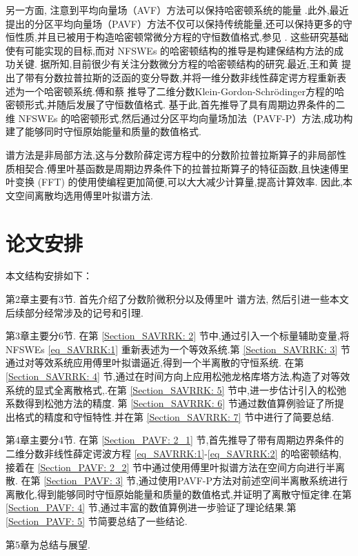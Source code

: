 另一方面,
注意到平均向量场（AVF）方法可以保持哈密顿系统的能量 \cite{buddGeometricIntegrationUsing1999,quispelNewClassEnergypreserving2008}.此外,最近提出的分区平均向量场（PAVF）方法不仅可以保持传统能量,还可以保持更多的守恒性质,并且已被用于构造哈密顿常微分方程的守恒数值格式,参见 \cite{caiPartitionedAveragedVector2018}.
这些研究基础使有可能实现的目标,而对 NFSWEs 的哈密顿结构的推导是构建保结构方法的成功关键.
据所知,目前很少有关注分数微分方程的哈密顿结构的研究.最近,王和黄 \cite{wangStructurepreservingNumericalMethods2018} 提出了带有分数拉普拉斯的泛函的变分导数,并将一维分数非线性薛定谔方程重新表述为一个哈密顿系统.傅和蔡 \cite{fuStructurepreservingAlgorithmsTwodimensional2020} 推导了二维分数Klein-Gordon-Schr{\"o}dinger方程的哈密顿形式,并随后发展了守恒数值格式.
基于此,首先推导了具有周期边界条件的二维 NFSWEs 的哈密顿形式,然后通过分区平均向量场加法（PAVF-P）方法,成功构建了能够同时守恒原始能量和质量的数值格式.

谱方法是非局部方法,这与分数阶薛定谔方程中的分数阶拉普拉斯算子的非局部性质相契合.傅里叶基函数是周期边界条件下的拉普拉斯算子的特征函数,且快速傅里叶变换 (FFT) 的使用使编程更加简便,可以大大减少计算量,提高计算效率.
因此,本文空间离散均选用傅里叶拟谱方法.

\section{论文安排}
本文结构安排如下：

第2章主要有3节. 首先介绍了分数阶微积分以及傅里叶 谱方法, 
然后引进一些本文后续部分经常涉及的记号和引理.

第3章主要分6节. 在第 \ref{Section_SAVRRK: 2} 节中,通过引入一个标量辅助变量,将NFSWEs \eqref{eq_SAVRRK:1} 重新表述为一个等效系统.第 \ref{Section_SAVRRK: 3} 节通过对等效系统应用傅里叶拟谱逼近,得到一个半离散的守恒系统.
在第 \ref{Section_SAVRRK: 4} 节,通过在时间方向上应用松弛龙格库塔方法,构造了对等效系统的显式全离散格式,.在第 \ref{Section_SAVRRK: 5} 节中,进一步估计引入的松弛系数得到松弛方法的精度.
第 \ref{Section_SAVRRK: 6} 节通过数值算例验证了所提出格式的精度和守恒特性.并在第 \ref{Section_SAVRRK: 7} 节中进行了简要总结.

第4章主要分4节. 在第 \ref{Section_PAVF: 2_1} 节,首先推导了带有周期边界条件的二维分数非线性薛定谔波方程 \eqref{eq_SAVRRK:1}-\eqref{eq_SAVRRK:2} 的哈密顿结构, 接着在 \ref{Section_PAVF: 2_2} 节中通过使用傅里叶拟谱方法在空间方向进行半离散.
在第 \ref{Section_PAVF: 3} 节,通过使用PAVF-P方法对前述空间半离散系统进行离散化,得到能够同时守恒原始能量和质量的数值格式,并证明了离散守恒定律.在第 \ref{Section_PAVF: 4} 节,通过丰富的数值算例进一步验证了理论结果.第 \ref{Section_PAVF: 5} 节简要总结了一些结论.

第5章为总结与展望.